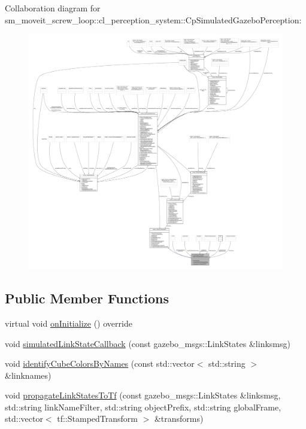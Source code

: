 Collaboration diagram for sm\+\_\+moveit\+\_\+screw\+\_\+loop\+:\+:cl\+\_\+perception\+\_\+system\+:\+:Cp\+Simulated\+Gazebo\+Perception\+:
\nopagebreak
\begin{figure}[H]
\begin{center}
\leavevmode
\includegraphics[width=350pt]{classsm__moveit__screw__loop_1_1cl__perception__system_1_1CpSimulatedGazeboPerception__coll__graph}
\end{center}
\end{figure}
\subsection*{Public Member Functions}
\begin{DoxyCompactItemize}
\item 
virtual void \hyperlink{classsm__moveit__screw__loop_1_1cl__perception__system_1_1CpSimulatedGazeboPerception_a7a683c96ef7ea9e26e856f104c3b8249}{on\+Initialize} () override
\item 
void \hyperlink{classsm__moveit__screw__loop_1_1cl__perception__system_1_1CpSimulatedGazeboPerception_a430e4834d41a548427c0f9af3f03a2f3}{simulated\+Link\+State\+Callback} (const gazebo\+\_\+msgs\+::\+Link\+States \&linksmsg)
\item 
void \hyperlink{classsm__moveit__screw__loop_1_1cl__perception__system_1_1CpSimulatedGazeboPerception_a3bc3d5a775d74573b93f8b585b89282c}{identify\+Cube\+Colors\+By\+Names} (const std\+::vector$<$ std\+::string $>$ \&linknames)
\item 
void \hyperlink{classsm__moveit__screw__loop_1_1cl__perception__system_1_1CpSimulatedGazeboPerception_a407cca108d4a7d0ae6a4eb3c4c843eaf}{propagate\+Link\+States\+To\+Tf} (const gazebo\+\_\+msgs\+::\+Link\+States \&linksmsg, std\+::string link\+Name\+Filter, std\+::string object\+Prefix, std\+::string global\+Frame, std\+::vector$<$ tf\+::\+Stamped\+Transform $>$ \&transforms)
\end{DoxyCompactItemize}

